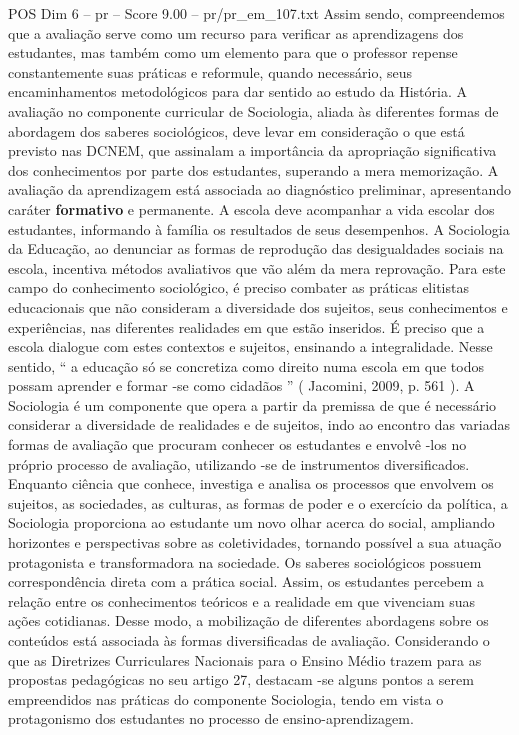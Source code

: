 \begin{textsample}{POS Dim 6 – pr – Score 9.00 – pr/pr\_em\_107.txt}
Assim sendo, compreendemos que a avaliação serve como um recurso para verificar as aprendizagens dos estudantes, mas também como um elemento para que o professor repense constantemente suas práticas e reformule, quando necessário, seus encaminhamentos metodológicos para dar sentido ao estudo da História.
A avaliação no componente curricular de Sociologia, aliada às diferentes formas de abordagem dos saberes sociológicos, deve levar em consideração o que está previsto nas DCNEM, que assinalam a importância da apropriação significativa dos conhecimentos por parte dos estudantes, superando a mera memorização.
A avaliação da aprendizagem está associada ao diagnóstico preliminar, apresentando caráter \textbf{formativo} e permanente.
A escola deve acompanhar a vida escolar dos estudantes, informando à família os resultados de seus desempenhos.
A Sociologia da Educação, ao denunciar as formas de reprodução das desigualdades sociais na escola, incentiva métodos avaliativos que vão além da mera reprovação.
Para este campo do conhecimento sociológico, é preciso combater as práticas elitistas educacionais que não consideram a diversidade dos sujeitos, seus conhecimentos e experiências, nas diferentes realidades em que estão inseridos.
É preciso que a escola dialogue com estes contextos e sujeitos, ensinando a integralidade.
Nesse sentido, “ a educação só se concretiza como direito numa escola em que todos possam aprender e formar -se como cidadãos ” ( Jacomini, 2009, p. 561 ).
A Sociologia é um componente que opera a partir da premissa de que é necessário considerar a diversidade de realidades e de sujeitos, indo ao encontro das variadas formas de avaliação que procuram conhecer os estudantes e envolvê -los no próprio processo de avaliação, utilizando -se de instrumentos diversificados.
Enquanto ciência que conhece, investiga e analisa os processos que envolvem os sujeitos, as sociedades, as culturas, as formas de poder e o exercício da política, a Sociologia proporciona ao estudante um novo olhar acerca do social, ampliando horizontes e perspectivas sobre as coletividades, tornando possível a sua atuação protagonista e transformadora na sociedade.
Os saberes sociológicos possuem correspondência direta com a prática social.
Assim, os estudantes percebem a relação entre os conhecimentos teóricos e a realidade em que vivenciam suas ações cotidianas.
Desse modo, a mobilização de diferentes abordagens sobre os conteúdos está associada às formas diversificadas de avaliação.
Considerando o que as Diretrizes Curriculares Nacionais para o Ensino Médio trazem para as propostas pedagógicas no seu artigo 27, destacam -se alguns pontos a serem empreendidos nas práticas do componente Sociologia, tendo em vista o protagonismo dos estudantes no processo de ensino-aprendizagem.

\end{textsample}
